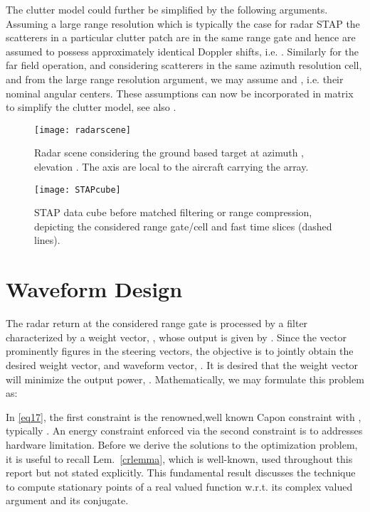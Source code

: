 \documentclass[11pt,draftclsnofoot,onecolumn]{IEEEtran}
\theoremstyle{definition}
\theoremstyle{remark}
\begin{document}
The clutter model could further be simplified by the following arguments. Assuming a large range resolution which is typically the case for radar STAP \cite{ward1994} the scatterers in a particular clutter patch are in the same range gate and hence are assumed to possess approximately identical Doppler shifts, i.e. . Similarly for the far field operation, and considering scatterers in the same azimuth resolution cell, and from the large range resolution argument, we may assume  and , i.e. their nominal angular centers. These assumptions can now be incorporated in matrix  to simplify the clutter model, see also \cite{Setlurradar2013}.
\begin{figure*}[tbp!]
\begin{minipage}[b]{0.5\linewidth}
\centering
\texttt{[image: radarscene]}
\caption{Radar scene considering the ground based target at azimuth , elevation . The  axis are local to the aircraft carrying the array.}
\label{fig1}
\end{minipage}
\hspace{0.4cm}
\begin{minipage}[b]{0.5\linewidth}
\centering
\texttt{[image: STAPcube]}
\caption{STAP data cube before matched filtering or range compression, depicting the considered range gate/cell and fast time slices (dashed lines).}
\label{fig2}
\end{minipage}
\end{figure*}
\section{Waveform Design}
The radar return at the considered range gate is processed by a filter characterized by a weight vector, , whose output is given by . Since the vector  prominently figures in the steering vectors, the objective is to jointly obtain the desired weight vector,  and waveform vector, . It is desired that the weight vector will  minimize the output power, . Mathematically, we may formulate this problem as:

In \eqref{eq17}, the first constraint is the renowned,well known Capon constraint with , typically . An energy constraint enforced via the second constraint is to addresses hardware limitation.  Before we derive the solutions to the optimization problem, it is useful to recall  Lem.~\ref{crlemma}, which is well-known, used throughout this report but not stated explicitly. This fundamental result discusses the technique to compute stationary points of a real valued function w.r.t. its complex valued argument and its conjugate.
\end{document}
